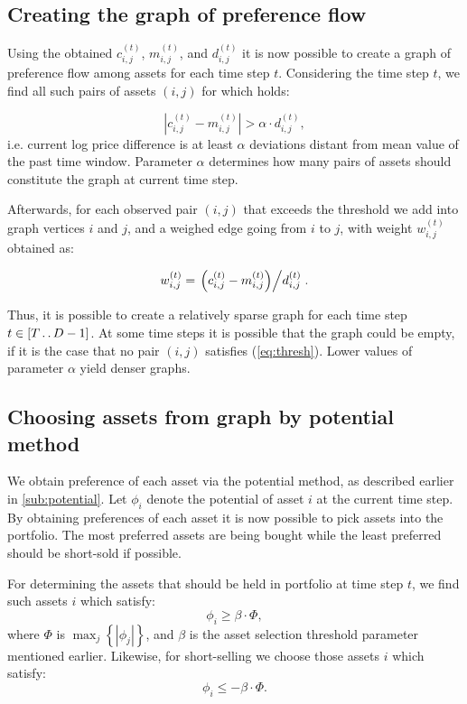 \documentclass[letterpaper, 10 pt, conference]{ieeeconf}
\newcommand{\upto}{\mathinner {\ldotp \ldotp}}
\begin{document}
  \subsection{Creating the graph of preference flow}
  
  Using the obtained $c_{i,j}^{(t)}$, $m_{i,j}^{(t)}$, and $d_{i,j}^{(t)}$ it is now possible to create a graph of preference flow among assets for each time step $t$.
  Considering the time step $t$, we find all such pairs of assets $(i,j)$ for which holds:
  
  \begin{equation}
    \label{eq:thresh}
    \left| c_{i,j}^{(t)} - m_{i,j}^{(t)} \right| > \alpha \cdot d_{i,j}^{(t)},
  \end{equation}
  i.e. current log price difference is at least $\alpha$ deviations distant from mean value of the past time window.
  Parameter $\alpha$ determines how many pairs of assets should constitute the graph at current time step.

  Afterwards, for each observed pair $(i,j)$ that exceeds the threshold we add into graph vertices $i$ and $j$, and a weighed edge going from $i$ to $j$, with weight $w_{i,j}^{(t)}$ obtained as:
  
  \begin{equation}
    \label{eq:weight}
    w_{i,j}^{(t)} = \left. \left(c_{i,j}^{(t)} - m_{i,j}^{(t)}\right) \middle/ d_{i,j}^{(t)} \right..
  \end{equation}
  
  Thus, it is possible to create a relatively sparse graph for each time step $t \in \left[T \upto D-1\right]$.
  At some time steps it is possible that the graph could be empty, if it is the case that no pair $(i,j)$ satisfies (\ref{eq:thresh}).
  Lower values of parameter $\alpha$ yield denser graphs.
  
  \subsection{Choosing assets from graph by potential method}
  We obtain preference of each asset via the potential method, as described earlier in \ref{sub:potential}.
  Let $\phi_i$ denote the potential of asset $i$ at the current time step.
  By obtaining preferences of each asset it is now possible to pick assets into the portfolio.
  The most preferred assets are being bought while the least preferred should be short-sold if possible.
  
  For determining the assets that should be held in portfolio at time step $t$, we find such assets $i$ which satisfy:
  \begin{equation}
    \phi_i \ge \beta \cdot \Phi,
  \end{equation}
  where $\Phi$ is $\max_j \left\{ \left| \phi_j \right| \right\}$, and $\beta$ is the asset selection threshold parameter mentioned earlier.
  Likewise, for short-selling we choose those assets $i$ which satisfy:
  \begin{equation}
  \phi_i \le -\beta \cdot \Phi.
  \end{equation}
  
\end{document}
